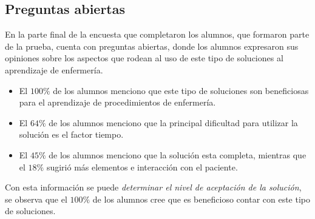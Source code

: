 \subsection{Preguntas abiertas}
\label{sec:res_subjetiva_abiertas}

En la parte final de la encuesta que completaron los alumnos, que formaron parte
de la prueba, cuenta con preguntas abiertas, donde los alumnos expresaron sus
opiniones sobre los aspectos que rodean al uso de este tipo de soluciones al
aprendizaje de enfermería.


\begin{itemize}
    \item El $100\%$ de los alumnos menciono que este tipo de soluciones son
        beneficiosas para el aprendizaje de procedimientos de enfermería.
    \item El $64\%$ de los alumnos menciono que la principal dificultad para
        utilizar la solución es el factor tiempo.
    \item El $45\%$ de los alumnos menciono que la solución esta completa,
        mientras que el $18\%$ sugirió más elementos e interacción con el
        paciente.
\end{itemize}


Con esta información se puede \emph{determinar el nivel de aceptación de la
    solución}, se observa que el $100\%$ de los alumnos cree que es beneficioso
contar con este tipo de soluciones.

